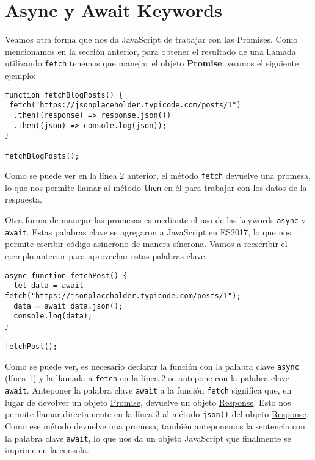 \documentclass[a4paper, oneside, titlepage, 12pt]{paper}
\begin{document}
\section{Async y Await Keywords}

Veamos otra forma que nos da JavaScript de trabajar con las Promises. Como mencionamos en la sección anterior, para obtener el resultado de una llamada utilizando \texttt{fetch}  tenemos que manejar el objeto \textbf{Promise}, veamos el siguiente ejemplo:

\begin{verbatim}
function fetchBlogPosts() {
 fetch("https://jsonplaceholder.typicode.com/posts/1")
  .then((response) => response.json())
  .then((json) => console.log(json));
}

fetchBlogPosts();
\end{verbatim}

Como se puede ver en la línea 2 anterior, el método \texttt{fetch} devuelve una promesa, lo que nos permite llamar al método \texttt{then} en él para trabajar con los datos de la respuesta.
\newline

Otra forma de manejar las promesas es mediante el uso de las keywords \texttt{async} y \texttt{await}. Estas palabras clave se agregaron a JavaScript en ES2017, lo que nos permite escribir código asíncrono de manera síncrona. Vamos a reescribir el ejemplo anterior para aprovechar estas palabras clave:

\begin{verbatim}
async function fetchPost() {
  let data = await fetch("https://jsonplaceholder.typicode.com/posts/1");
  data = await data.json();
  console.log(data);
}

fetchPost();
\end{verbatim}

Como se puede ver, es necesario declarar la función con la palabra clave \texttt{async} (línea 1) y la llamada a \texttt{fetch} en la línea 2 se antepone con la palabra clave \texttt{await}. Anteponer la palabra clave \texttt{await} a la función \texttt{fetch} significa que, en lugar de devolver un objeto \href{https://developer.mozilla.org/es/docs/Web/JavaScript/Reference/Global_Objects/Promise}{Promise}, devuelve un objeto \href{https://developer.mozilla.org/es/docs/Web/API/Response}{Response}. Esto nos permite llamar directamente en la línea 3 al método \texttt{json()} del objeto \href{https://developer.mozilla.org/es/docs/Web/API/Response}{Response}. Como ese método devuelve una promesa, también anteponemos la sentencia con la palabra clave \texttt{await}, lo que nos da un objeto JavaScript que finalmente se imprime en la consola.
\newline
\end{document}
